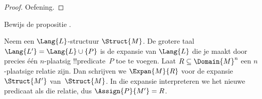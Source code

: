 \documentclass[../../../include/open-logic-section]{subfiles}
\begin{document}
\begin{proof}
  Oefening.
\end{proof}

\begin{prob}
Bewijs de propositie .
\end{prob}

\begin{defn}
Neem een $\Lang{L}$-structuur $\Struct{M}$. De grotere taal
$\Lang{L'} = \Lang{L} \cup \{P\}$ is de expansie van $\Lang{L}$ die
je maakt door precies één $n$-plaatsig !!{predicate}~$P$ toe te voegen.
Laat
$R \subseteq \Domain{M}^n$ een $n$-plaatsige relatie zijn. Dan
schrijven we $\Expan{M}{R}$ voor de expansie~$\Struct{M'}$
van~$\Struct{M}$. In die expansie interpreteren we het nieuwe predicaat
als die relatie, dus $\Assign{P}{M'} = R$.
\end{defn}
\end{document}
